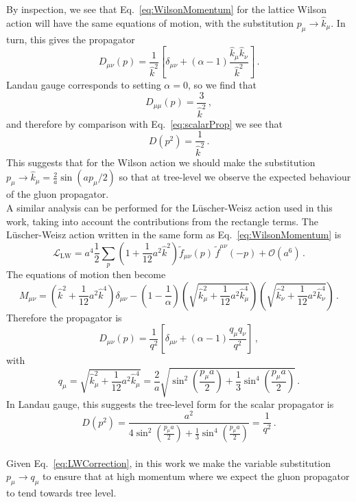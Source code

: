 %
By inspection, we see that Eq.~\eqref{eq:WilsonMomentum} for the lattice Wilson action will have the same equations of motion, with the substitution $p_\mu\rightarrow \hat{k}_\mu$. In turn, this gives the propagator
%
\begin{equation}
D_{\mu\nu}(p) = \frac{1}{\hat{k}^2}\left[\delta_{\mu\nu} + (\alpha-1)\frac{\hat{k}_\mu \hat{k}_\nu}{\hat{k}^2}\right]\, .
\end{equation}
Landau gauge corresponds to setting $\alpha=0$, so we find that
%
\begin{equation}
D_{\mu\mu}(p) = \frac{3}{\hat{k}^2}\, ,
\end{equation}
%
and therefore by comparison with Eq.~\eqref{eq:scalarProp} we see that
%
\begin{equation}
D(p^2) = \frac{1}{\hat{k}^2}\, .
\end{equation}
%
This suggests that for the Wilson action we should make the substitution $p_\mu\rightarrow \hat{k}_\mu = \frac{2}{a}\sin\left(a p_\mu/2\right)$ so that at tree-level we observe the expected behaviour of the gluon propagator.\\

A similar analysis can be performed for the L\"uscher-Weisz action used in this work, taking into account the contributions from the rectangle terms. The L\"uscher-Weisz action written in the same form as Eq.~\eqref{eq:WilsonMomentum} is~\cite{Weisz:1982zw}
%
\begin{equation}
\mathcal{L}_\text{LW} = a^4\frac{1}{2}\sum_p \left(1+\frac{1}{12}a^2\hat{k}^2\right) \tilde{f}_{\mu\nu}(p) \, \tilde{f}^{\mu\nu}(-p) + \mathcal{O}(a^6)\, .
\end{equation}
%
The equations of motion then become
%
\begin{equation}
M_{\mu\nu} = \left(\hat{k}^2 + \frac{1}{12}a^2\hat{k}^4\right)\delta_{\mu\nu} - \left(1-\frac{1}{\alpha}\right)\left(\sqrt{\hat{k}_\mu^2 + \frac{1}{12}a^2\hat{k}_\mu^4}\right)\left(\sqrt{\hat{k}_\nu^2 + \frac{1}{12}a^2\hat{k}_\nu^4}\right)\, .
\end{equation}
Therefore the propagator is
%
\begin{equation}
D_{\mu\nu}(p) = \frac{1}{q^2}\left[\delta_{\mu\nu} + (\alpha-1)\frac{q_\mu q_\nu}{q^2}\right]\, ,
\end{equation}
with
\begin{equation}
q_\mu = \sqrt{\hat{k}_\mu^2 + \frac{1}{12}a^2\hat{k}_\mu^4} = \frac{2}{a}\sqrt { \sin ^ { 2 } \left( \frac { p _ { \mu } a } { 2 } \right) + \frac { 1 } { 3 } \sin ^ { 4 } \left( \frac { p _ { \mu } a } { 2 } \right) }\, .
\end{equation}
%
In Landau gauge, this suggests the tree-level form for the scalar propagator is
%
\begin{equation}
D(p^2) = \frac{a^2}{4 \sin ^ { 2 } \left( \frac { p _ { \mu } a } { 2 } \right) + \frac { 1 } { 3 } \sin ^ { 4 } \left( \frac { p _ { \mu } a } { 2 } \right)} = \frac{1}{q^2}\, .
\label{eq:LWCorrection}
\end{equation}\\
Given Eq.~\eqref{eq:LWCorrection}, in this work we make the variable substitution $p_\mu\rightarrow q_\mu$ to ensure that at high momentum where we expect the gluon propagator to tend towards tree level.

